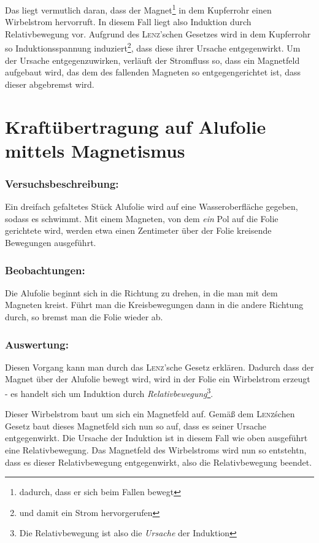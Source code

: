 Das liegt vermutlich daran, dass der Magnet\footnote{dadurch, dass er sich beim Fallen bewegt} in dem Kupferrohr einen Wirbelstrom hervorruft. In diesem Fall liegt also Induktion durch Relativbewegung vor. Aufgrund des \textsc{Lenz}'schen Gesetzes wird in dem Kupferrohr so Induktionsspannung induziert\footnote{und damit ein Strom hervorgerufen}, dass diese ihrer Ursache entgegenwirkt. Um der Ursache entgegenzuwirken, verläuft der Stromfluss so, dass ein Magnetfeld aufgebaut wird, das dem des fallenden Magneten so entgegengerichtet ist, dass dieser abgebremst wird.



		\section{Kraftübertragung auf Alufolie mittels Magnetismus}
		\label{alumag}
	
		\subsubsection*{Versuchsbeschreibung:}
Ein dreifach gefaltetes Stück Alufolie wird auf eine Wasseroberfläche gegeben, sodass es schwimmt. Mit einem Magneten, von dem \emph{ein} Pol auf die Folie gerichtete wird, werden etwa einen Zentimeter über der Folie kreisende Bewegungen ausgeführt.
		
		\subsubsection*{Beobachtungen:}		
Die Alufolie beginnt sich in die Richtung zu drehen, in die man mit dem Magneten kreist. Führt man die Kreisbewegungen dann in die andere Richtung durch, so bremst man die Folie wieder ab.
		
		\subsubsection*{Auswertung:}

Diesen Vorgang kann man durch das \textsc{Lenz}'sche Gesetz erklären. Dadurch dass der Magnet über der Alufolie bewegt wird, wird in der Folie ein Wirbelstrom erzeugt - es handelt sich um Induktion durch \textit{Relativbewegung}\footnote{Die Relativbewegung ist also die \textit{Ursache} der Induktion}.

Dieser Wirbelstrom baut um sich ein Magnetfeld auf. Gemäß dem \textsc{Lenz}\'schen Gesetz baut dieses Magnetfeld sich nun so auf, dass es seiner Ursache entgegenwirkt. Die Ursache der Induktion ist in diesem Fall wie oben ausgeführt eine Relativbewegung. Das Magnetfeld des Wirbelstroms wird nun so entstehtn, dass es dieser Relativbewegung entgegenwirkt, also die Relativbewegung beendet. 

